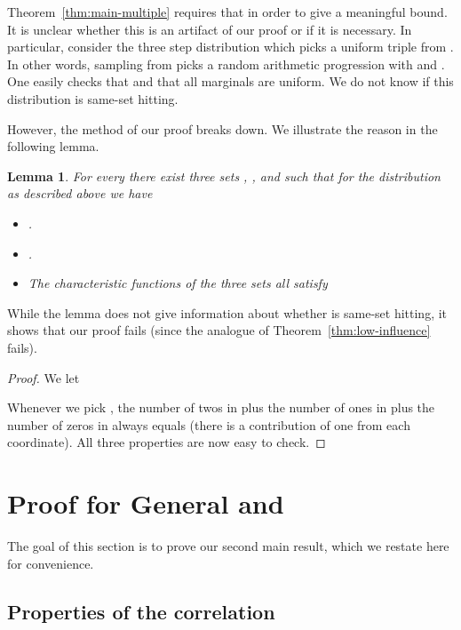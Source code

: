 \documentclass{daj}
\newcommand{\1}{\mathbbm{1}}
\theoremstyle{plain}
\newtheorem{lemma}[theorem]{Lemma}
\theoremstyle{definition}
\begin{document}
Theorem~\ref{thm:main-multiple} requires that  in order to give a
meaningful bound.  It is unclear whether this is an artifact of our proof or if
it is necessary.  In particular, consider the three step distribution  
which
picks a uniform triple from
.
In other words, sampling from  picks a random
arithmetic progression  with 
and .
One easily
checks that  and that all marginals are uniform.
We do not know if this distribution is same-set hitting.

However, the method of our proof breaks down. 
We illustrate the reason in the following lemma.
\begin{lemma}\label{lem:threeSetFail}
For every  there exist three sets , , and  such 
that for
the distribution  as described above we have
\begin{itemize}
\item .
\item .
\item The characteristic functions  of the three sets all
satisfy

\end{itemize}
\end{lemma}
While the lemma does not give information about whether  is
same-set hitting, it shows that
our proof fails (since the analogue of Theorem~\ref{thm:low-influence}
fails).
\begin{proof}
We let 

Whenever we pick
, the number of
twos in  plus the number of ones in 
plus the number of zeros in  always equals  (there is a
contribution of one from each coordinate).  All three properties are now easy to
check.
\end{proof}

\section{Proof for General
\texorpdfstring{}{l}
and
\texorpdfstring{}{rho(P) < 1}}
\label{sec:main-proof}

The goal of this section is to prove our second main result, which we
restate here for convenience.

\mainmultiple*

\subsection{Properties of the correlation}
\label{sec:correlation-properties}
\end{document}
